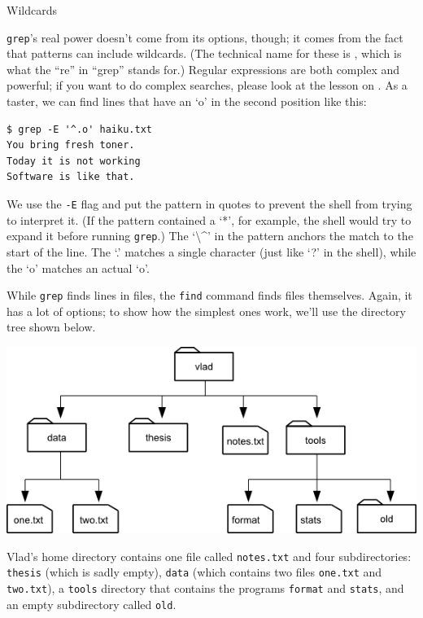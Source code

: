 \documentclass{book}
\begin{document}
\begin{swcbox}{Wildcards}

\texttt{grep}'s real power doesn't come from its options, though; it
comes from the fact that patterns can include wildcards. (The technical
name for these is ,
which is what the ``re'' in ``grep'' stands for.) Regular expressions
are both complex and powerful; if you want to do complex searches,
please look at the lesson on . As a taster, we can find lines that have an `o' in the second
position like this:

\begin{verbatim}
$ grep -E '^.o' haiku.txt
You bring fresh toner.
Today it is not working
Software is like that.
\end{verbatim}

We use the \texttt{-E} flag and put the pattern in quotes to prevent the
shell from trying to interpret it. (If the pattern contained a `*', for
example, the shell would try to expand it before running \texttt{grep}.)
The `\textbackslash{}\^{}' in the pattern anchors the match to the start
of the line. The `.' matches a single character (just like `?' in the
shell), while the `o' matches an actual `o'.

\end{swcbox}

While \texttt{grep} finds lines in files, the \texttt{find} command
finds files themselves. Again, it has a lot of options; to show how the
simplest ones work, we'll use the directory tree shown below.

\includegraphics{novice/shell/img/find-file-tree.png}

Vlad's home directory contains one file called \texttt{notes.txt} and
four subdirectories: \texttt{thesis} (which is sadly empty),
\texttt{data} (which contains two files \texttt{one.txt} and
\texttt{two.txt}), a \texttt{tools} directory that contains the programs
\texttt{format} and \texttt{stats}, and an empty subdirectory called
\texttt{old}.
\end{document}
